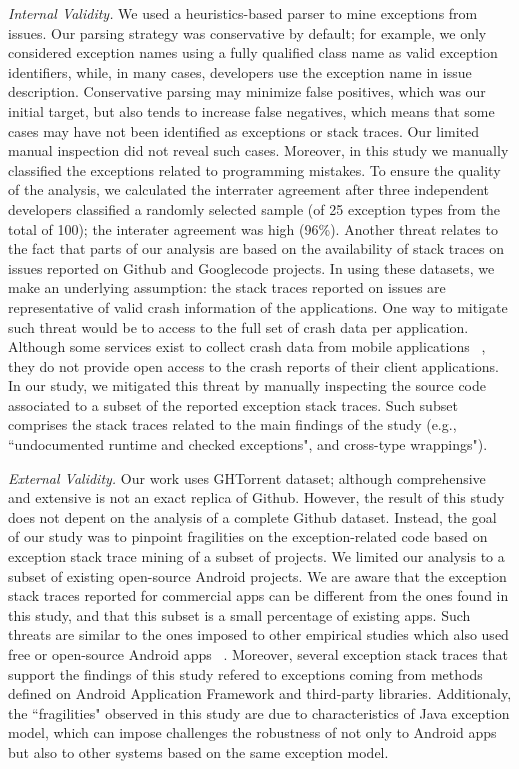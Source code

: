 \documentclass[conference]{IEEEtran}
\begin{document}
\emph{Internal Validity.} We used a heuristics-based parser to mine
exceptions from issues.  Our parsing strategy was conservative by default; for
example, we only considered exception names using a fully qualified class name
as valid exception identifiers, while, in many cases, developers use the
exception name in issue description. Conservative parsing may minimize false
positives, which was our initial target, but also tends to increase false
negatives, which means that some cases may have not been identified as
exceptions or stack traces. Our limited manual inspection did not reveal such
cases. Moreover, in this study we manually classified the exceptions 
related to programming mistakes. To ensure the quality of the analysis, 
we calculated the interrater agreement after three independent 
developers classified a randomly selected sample (of 25 exception 
types from the total of 100); the interater agreement was high (96\%). 
Another threat relates to the fact that parts of our analysis 
are based on the availability of stack traces on issues reported on Github and Googlecode projects. 
In using these datasets, we make an underlying assumption: the stack traces reported on issues are 
representative of valid crash information of the applications. 
One way to mitigate such threat would be to access to the full 
set of crash data per application. Although some services exist 
to collect crash data from mobile applications ~\cite{BugSe14,BugSn14,Googl14,Acra14},
they do not provide open access to the crash reports of their client applications.
In our study, we mitigated this threat by manually inspecting
the source code associated to a subset of the reported exception stack traces.
Such subset comprises the stack traces related to the main findings 
of the study (e.g., ``undocumented runtime and checked exceptions",
and cross-type wrappings").

\emph{External Validity.} Our work uses GHTorrent dataset; although 
comprehensive and extensive is not an exact replica of Github. 
However, the result of this study does not depent on the analysis of
a complete Github dataset. Instead, the goal of our study was to 
pinpoint fragilities on the exception-related code based on 
exception stack trace mining of a subset of projects.
We limited our analysis to a subset of existing open-source Android projects.
We are aware that the exception stack traces reported 
for commercial apps can be different from the ones found in this study, and that
this subset is a small percentage of existing apps.
Such threats are similar to the ones imposed to other empirical studies 
which also used free or open-source Android apps ~\cite{Linar13,McDon13,ahimed}.
Moreover, several exception stack traces that support the findings of this study
refered to exceptions coming from methods defined on Android Application Framework
and third-party libraries.  Additionaly,  the ``fragilities" observed in this study are due to
characteristics of Java exception model, which can impose challenges 
the robustness of not only to Android apps but also to other systems
 based on the same exception model. 
\end{document}
